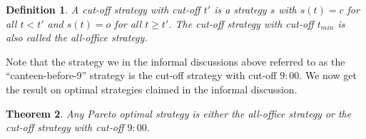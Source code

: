 \documentclass[twocolumn,a4paper,superscriptaddress,nofootinbib]{revtex4}
\newtheorem{theorem}{Theorem}
\newtheorem{definition}[theorem]{Definition}
\begin{document}
\begin{definition}
A \emph{cut-off strategy with cut-off $t'$} is a strategy $s$ with $s(t) = c$ for all $t < t'$ and $s(t) = o$ for all $t \geq t'$. %
The cut-off strategy with cut-off $t_{min}$ is also called the \emph{all-office strategy}.
\end{definition}
Note that the strategy we in the informal discussions above referred to as the ``canteen-before-9'' strategy is the cut-off strategy with cut-off $9{:}00$. We now get the result on optimal strategies claimed in the informal discussion.
\begin{theorem}\label{theorem:all-office-or-cut-off}
Any Pareto optimal strategy is either the all-office strategy or the cut-off strategy with cut-off $9{:}00$.
\end{theorem}
\end{document}
